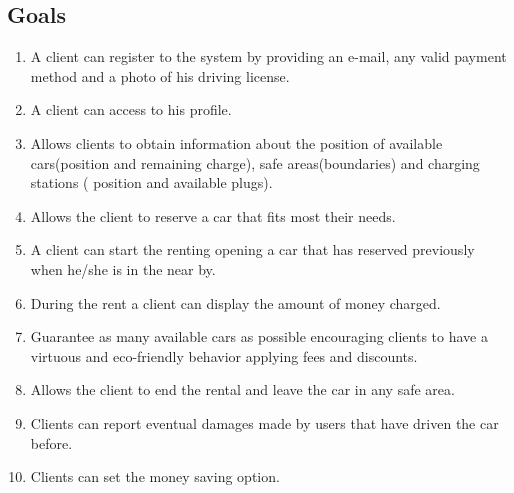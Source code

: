 \documentclass[a4paper]{article}
\begin{document}
\subsection{Goals}

\begin{enumerate}
\item A client can register to the system by providing an e-mail, any valid payment method and a photo of his driving license.

\item A client can access to his profile.

\item Allows clients to obtain information about
the position of available cars(position and remaining charge), safe areas(boundaries) and charging stations ( position and available plugs).

\item Allows the client to reserve a car that fits most their needs.

\item A client can start the renting opening a car that has reserved previously when he/she is in the near by.

\item During the rent a client can display the amount of money charged.

\item Guarantee as many available cars as possible encouraging clients to have a virtuous and eco-friendly behavior applying fees and discounts.

\item Allows the client to end the rental and leave the car in any safe area.

\item Clients can report eventual damages made by users that have driven the car before. %

\item Clients can set the money saving option.


\end{enumerate}
\end{document}
